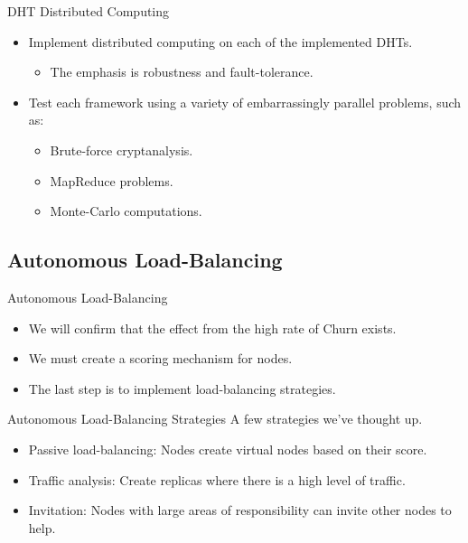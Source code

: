 \documentclass[11pt]{beamer}
\begin{document}
\begin{frame}{DHT Distributed Computing}
	\begin{itemize}
			\item Implement distributed computing on each of the implemented DHTs.
			\begin{itemize}
				\item The emphasis is robustness and fault-tolerance.
			\end{itemize}
			\item Test each framework using a variety of embarrassingly parallel problems, such as:
			\begin{itemize}
				\item Brute-force cryptanalysis.
				\item MapReduce problems.
				\item Monte-Carlo computations.
			\end{itemize}
	\end{itemize}
\end{frame}


\subsection{Autonomous Load-Balancing}
\begin{frame}{Autonomous Load-Balancing}
	\begin{itemize}
		\item We will confirm that the effect from the high rate of Churn exists.
		\item We must create a scoring mechanism for nodes.
		\item The last step is to implement load-balancing strategies.
	\end{itemize}
\end{frame}

\begin{frame}{Autonomous Load-Balancing Strategies}
	A few strategies we've thought up.
	\begin{itemize}
		\item Passive load-balancing: Nodes create virtual nodes based on their score.
		\item Traffic analysis:  Create replicas where there is a high level of traffic.
		\item Invitation:  Nodes with large areas of responsibility can invite other nodes to help.
		
	\end{itemize}
\end{frame}




\end{document}
